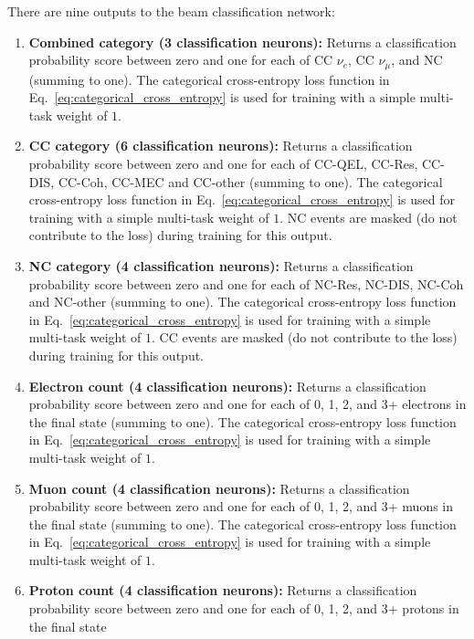There are nine outputs to the beam classification network:
\begin{enumerate}
    \item \textbf{Combined category (3 classification neurons):} Returns a classification
          probability score between zero and one for each of CC $\nu_{e}$, CC $\nu_{\mu}$, and NC
          (summing to one). The categorical cross-entropy loss function in
          Eq.~\ref{eq:categorical_cross_entropy} is used for training with a simple multi-task
          weight of $1$.
    \item \textbf{CC category (6 classification neurons):} Returns a classification probability
          score between zero and one for each of CC-QEL, CC-Res, CC-DIS, CC-Coh, CC-MEC and
          CC-other (summing to one). The categorical cross-entropy loss function in
          Eq.~\ref{eq:categorical_cross_entropy} is used for training with a simple multi-task
          weight of $1$. NC events are masked (do not contribute to the loss) during training for
          this output.
    \item \textbf{NC category (4 classification neurons):} Returns a classification probability
          score between zero and one for each of NC-Res, NC-DIS, NC-Coh and NC-other (summing to
          one). The categorical cross-entropy loss function in
          Eq.~\ref{eq:categorical_cross_entropy} is used for training with a simple multi-task
          weight of $1$. CC events are masked (do not contribute to the loss) during training for
          this output.
    \item \textbf{Electron count (4 classification neurons):} Returns a classification probability
          score between zero and one for each of 0, 1, 2, and 3+ electrons in the final state
          (summing to one). The categorical cross-entropy loss function in
          Eq.~\ref{eq:categorical_cross_entropy} is used for training with a simple multi-task
          weight of $1$.
    \item \textbf{Muon count (4 classification neurons):} Returns a classification probability
          score between zero and one for each of 0, 1, 2, and 3+ muons in the final state (summing
          to one). The categorical cross-entropy loss function in
          Eq.~\ref{eq:categorical_cross_entropy} is used for training with a simple multi-task
          weight of $1$.
    \item \textbf{Proton count (4 classification neurons):} Returns a classification probability
          score between zero and one for each of 0, 1, 2, and 3+ protons in the final state

\end{enumerate}
